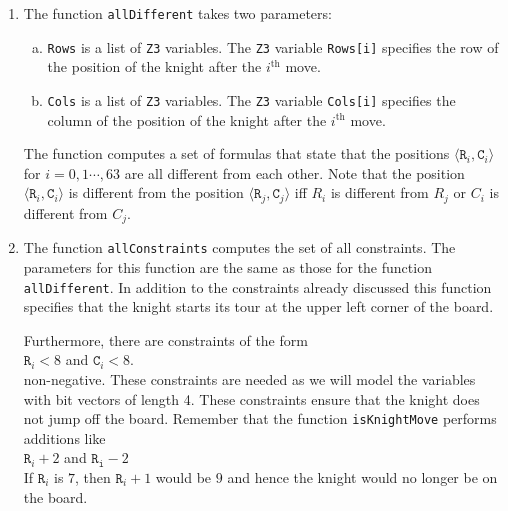 \begin{enumerate}
      In line 18 we use the fact that the function \texttt{Z3.Or} can take any number of arguments.  If
      \texttt{Formulas} is the set  
      \\[0.2cm]
      \hspace*{1.3cm}
      $\texttt{Formulas} = \{f_1, \cdots, f_n\}$,
      \\[0.2cm]
      then the notation \texttt{z3.Or(...Formulas)} is expanded into the call
      \\[0.2cm]
      \hspace*{1.3cm}
      $\texttt{z3.Or}(f_1, \cdots, f_n)$,
      \\[0.2cm]
      which computes the logical disjunction
      \\[0.2cm]
      \hspace*{1.3cm}
      $f_1 \vee \cdots \vee f_n$.
\item The function \texttt{allDifferent} takes two parameters:
      \begin{enumerate}[(a)]
      \item \texttt{Rows} is a list of \texttt{Z3} variables. The \texttt{Z3} variable \texttt{Rows[i]}
            specifies the row of the position of the knight after the $i^{\textrm{th}}$ move. 
      \item \texttt{Cols} is a list of \texttt{Z3} variables. The \texttt{Z3} variable \texttt{Cols[i]}
            specifies the column of the position of the knight after the $i^{\textrm{th}}$ move. 
      \end{enumerate}
      The function computes a set of formulas that state that the positions
      $\langle \mathtt{R}_i, \mathtt{C}_i \rangle$ for $i=0,1\cdots, 63$ are all different from each other.
      Note that the position $\langle \mathtt{R}_i, \mathtt{C}_i \rangle$ is different from the position
      $\langle \mathtt{R}_j, \mathtt{C}_j \rangle$ iff $R_i$ is different from $R_j$ or $C_i$ is different from
      $C_j$.
\item The function \texttt{allConstraints} computes the set of all constraints.
      The parameters for this function are the same as those for the function \texttt{allDifferent}.
      In addition to the constraints already discussed this function specifies that the knight starts
      its tour at the upper left corner of the board.

      Furthermore, there are constraints of the form
      \\[0.2cm]
      \hspace*{1.3cm}
      $\mathtt{R}_i < 8$ \quad and \quad $\mathtt{C}_i < 8$.
      \\[0.2cm]
      non-negative.  These constraints are needed as we will model the variables with bit vectors of length 4.
      These constraints ensure that the knight does not jump off the board.  Remember that the function
      \texttt{isKnightMove} performs additions like
      \\[0.2cm]
      \hspace*{1.3cm}
      $\mathtt{R}_i + 2$ \quad and \quad $\mathtt{R_i} - 2$
      \\[0.2cm]
      If $\mathtt{R}_i$ is $7$, then $\mathtt{R}_i + 1$ would be $9$ and hence the knight would no longer be on
      the board.


\end{enumerate}
